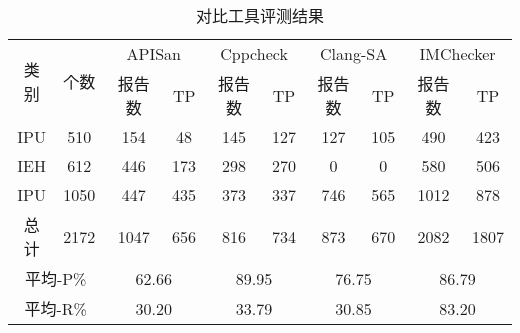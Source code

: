 \begin{table}[b]
	\centering
	\begin{minipage}[t]{0.9\linewidth} %
		\caption{对比工具评测结果}
		\label{tab:3-4-other}
		\begin{tabular}{cccccccccc}
			\hline
			\multirow{2}{*}{类别 } & \multirow{2}{*}{个数} & \multicolumn{2}{c}{APISan} & \multicolumn{2}{c}{Cppcheck} & \multicolumn{2}{c}{Clang-SA} & \multicolumn{2}{c}{IMChecker}\\
			\cline{3-10}
			 & & 报告数 & TP & 报告数 & TP& 报告数 & TP & 报告数 & TP \\
			 \hline
			 IPU & 510 &  154 & 48 & 145 &127 &127 &105 & 490 & 423\\
			 IEH & 612 &  446 &173& 298& 270& 0& 0& 580& 506 \\
			 IPU & 1050 &  447 &435 &373 &337 &746& 565 &1012 &878 \\
			 总计 & 2172 &   1047& 656& 816& 734& 873& 670& 2082& 1807 \\
			 \multicolumn{2}{c}{平均-P\%} &\multicolumn{2}{c}{62.66}  & \multicolumn{2}{c}{89.95}  &\multicolumn{2}{c}{76.75}  &\multicolumn{2}{c}{86.79} \\
			 \multicolumn{2}{c}{平均-R\%} & \multicolumn{2}{c}{30.20} & \multicolumn{2}{c}{33.79}  &\multicolumn{2}{c}{30.85}  &\multicolumn{2}{c}{83.20}  \\
			\hline
		\end{tabular}
	\end{minipage}
\end{table}